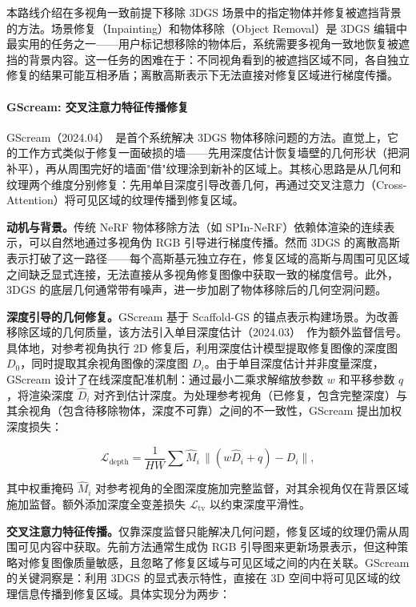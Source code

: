 本路线介绍在多视角一致前提下移除 3DGS 场景中的指定物体并修复被遮挡背景的方法。场景修复（Inpainting）和物体移除（Object Removal）是 3DGS 编辑中最实用的任务之一——用户标记想移除的物体后，系统需要多视角一致地恢复被遮挡的背景内容。这一任务的困难在于：不同视角看到的被遮挡区域不同，各自独立修复的结果可能互相矛盾；离散高斯表示下无法直接对修复区域进行梯度传播。

\paragraph{GScream: 交叉注意力特征传播修复}

GScream（2024.04）~\cite{2404_13679}是首个系统解决 3DGS 物体移除问题的方法。直觉上，它的工作方式类似于修复一面破损的墙——先用深度估计恢复墙壁的几何形状（把洞补平），再从周围完好的墙面"借"纹理涂到新补的区域上。其核心思路是从几何和纹理两个维度分别修复：先用单目深度引导改善几何，再通过交叉注意力（Cross-Attention）将可见区域的纹理传播到修复区域。

\textbf{动机与背景。}传统 NeRF 物体移除方法（如 SPIn-NeRF）依赖体渲染的连续表示，可以自然地通过多视角伪 RGB 引导进行梯度传播。然而 3DGS 的离散高斯表示打破了这一路径——每个高斯基元独立存在，修复区域的高斯与周围可见区域之间缺乏显式连接，无法直接从多视角修复图像中获取一致的梯度信号。此外，3DGS 的底层几何通常带有噪声，进一步加剧了物体移除后的几何空洞问题。

\textbf{深度引导的几何修复。}GScream 基于 Scaffold-GS 的锚点表示构建场景。为改善移除区域的几何质量，该方法引入单目深度估计（2024.03）~\cite{2403_12721}作为额外监督信号。具体地，对参考视角执行 2D 修复后，利用深度估计模型提取修复图像的深度图 $D_0$，同时提取其余视角图像的深度图 $D_i$。由于单目深度估计并非度量深度，GScream 设计了在线深度配准机制：通过最小二乘求解缩放参数 $w$ 和平移参数 $q$，将渲染深度 $\hat{D}_i$ 对齐到估计深度。为处理参考视角（已修复，包含完整深度）与其余视角（包含待移除物体，深度不可靠）之间的不一致性，GScream 提出加权深度损失：

\begin{equation}
\mathcal{L}_{\text{depth}} = \frac{1}{HW} \sum \hat{M}_i \, \| (w\hat{D}_i + q) - D_i \|,
\end{equation}

其中权重掩码 $\hat{M}_i$ 对参考视角的全图深度施加完整监督，对其余视角仅在背景区域施加监督。额外添加深度全变差损失 $\mathcal{L}_{\text{tv}}$ 以约束深度平滑性。

\textbf{交叉注意力特征传播。}仅靠深度监督只能解决几何问题，修复区域的纹理仍需从周围可见内容中获取。先前方法通常生成伪 RGB 引导图来更新场景表示，但这种策略对修复图像质量敏感，且忽略了修复区域与可见区域之间的内在关联。GScream 的关键洞察是：利用 3DGS 的显式表示特性，直接在 3D 空间中将可见区域的纹理信息传播到修复区域。具体实现分为两步：

